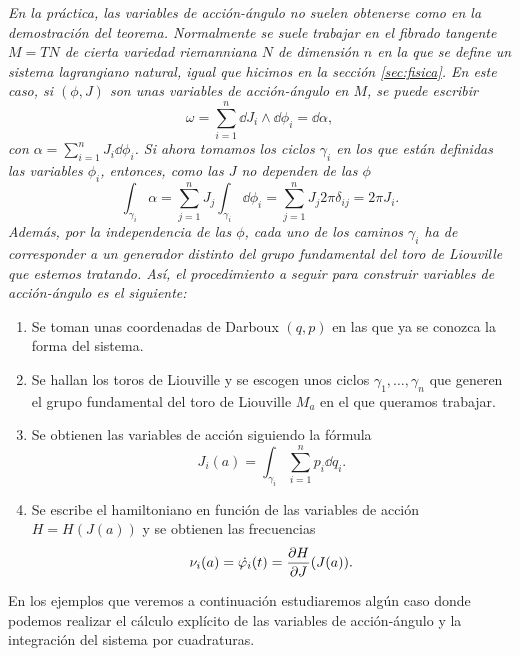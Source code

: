 \begin{obs}
  \em
  En la práctica, las variables de acción-ángulo no suelen obtenerse como en la demostración del teorema. Normalmente se suele trabajar en el fibrado tangente $M=TN$ de cierta variedad riemanniana $N$ de dimensión $n$ en la que se define un sistema lagrangiano natural, igual que hicimos en la sección \ref{sec:fisica}. En este caso, si $(\phi,J)$ son unas variables de acción-ángulo en $M$, se puede escribir
\begin{equation*}
  \omega=\sum_{i=1}^n \dd J_i \wedge \dd \phi_i = \dd \alpha,
\end{equation*}
con $\alpha=\sum_{i=1}^n J_i \dd \phi_i$. Si ahora tomamos los ciclos $\gamma_i$ en los que están definidas las variables $\phi_i$, entonces, como las $J$ no dependen de las $\phi$
\begin{equation*}
  \int_{\gamma_i} \alpha = \sum_{j=1}^n J_j \int_{\gamma_i}\dd \phi_i = \sum_{j=1}^n J_j 2\pi \delta_{ij}= 2\pi J_i.
\end{equation*}
Además, por la independencia de las $\phi$, cada uno de los caminos $\gamma_i$ ha de corresponder a un generador distinto del grupo fundamental del toro de Liouville que estemos tratando.
Así, el procedimiento a seguir para construir variables de acción-ángulo es el siguiente:
\begin{enumerate}
  \item Se toman unas coordenadas de Darboux $(q,p)$ en las que ya se conozca la forma del sistema.
  \item Se hallan los toros de Liouville y se escogen unos ciclos $\gamma_1,\dots,\gamma_n$ que generen el grupo fundamental del toro de Liouville $M_a$ en el que queramos trabajar.
  \item Se obtienen las variables de acción siguiendo la fórmula
    \begin{equation*}
      J_i(a)=\int_{\gamma_i} \sum_{i=1}^n p_i \dd q_i.
    \end{equation*}
  \item Se escribe el hamiltoniano en función de las variables de acción $H=H(J(a))$ y se obtienen las frecuencias 
    \begin{equation*}
      \nu_i(a)= \dot{\varphi_i}(t)=\frac{\partial H}{\partial J}(J(a)).
    \end{equation*}
\end{enumerate}
\end{obs}

En los ejemplos que veremos a continuación estudiaremos algún caso donde podemos realizar el cálculo explícito de las variables de acción-ángulo y la integración del sistema por cuadraturas.

